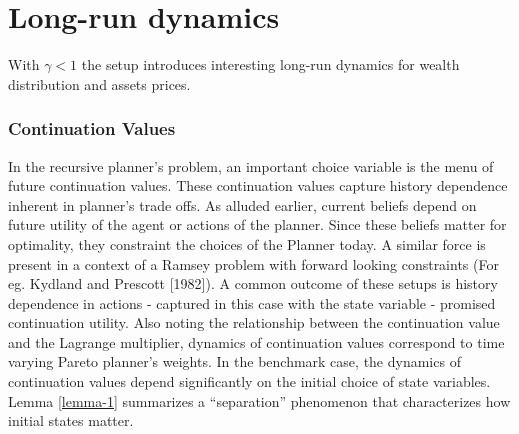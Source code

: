 \documentclass[12pt]{article}
\begin{document}
\section{Long-run dynamics}
With $\gamma<1$ the setup introduces interesting long-run dynamics for wealth distribution and assets prices.

\subsubsection{Continuation Values}
In the recursive planner's problem, an important choice variable is the menu of future continuation values. These continuation values capture history dependence inherent in planner's trade offs. As alluded earlier, current beliefs depend on future utility of the agent or actions of the planner. Since these beliefs matter for optimality, they constraint the choices of the Planner today. A similar force is present in a context of a Ramsey problem with forward looking constraints (For eg. Kydland and Prescott [1982]). A common outcome of these setups is history dependence in actions - captured in this case with the state variable - promised continuation utility. Also noting the relationship between the continuation value and the Lagrange multiplier, dynamics of continuation values correspond to time varying Pareto planner's weights. In the benchmark case, the dynamics of continuation values depend significantly on the initial choice of state variables. Lemma \ref{lemma-1} summarizes a ``separation'' phenomenon 
that characterizes how initial states matter. 
\end{document}

